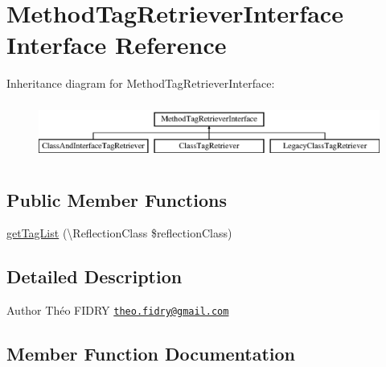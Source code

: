 \hypertarget{interface_prophecy_1_1_php_documentor_1_1_method_tag_retriever_interface}{}\section{Method\+Tag\+Retriever\+Interface Interface Reference}
\label{interface_prophecy_1_1_php_documentor_1_1_method_tag_retriever_interface}
Inheritance diagram for Method\+Tag\+Retriever\+Interface\+:\begin{figure}[H]
\begin{center}
\leavevmode
\includegraphics[height=1.895093cm]{interface_prophecy_1_1_php_documentor_1_1_method_tag_retriever_interface}
\end{center}
\end{figure}
\subsection*{Public Member Functions}
\begin{DoxyCompactItemize}
\item 
\mbox{\hyperlink{interface_prophecy_1_1_php_documentor_1_1_method_tag_retriever_interface_a2eb68ce00dcc84a156b9a2b7844a5e6f}{get\+Tag\+List}} (\textbackslash{}Reflection\+Class \$reflection\+Class)
\end{DoxyCompactItemize}


\subsection{Detailed Description}
\begin{DoxyAuthor}{Author}
Théo F\+I\+D\+RY \href{mailto:theo.fidry@gmail.com}{\tt theo.\+fidry@gmail.\+com} 
\end{DoxyAuthor}


\subsection{Member Function Documentation}
\mbox{\label{interface_prophecy_1_1_php_documentor_1_1_method_tag_retriever_interface_a2eb68ce00dcc84a156b9a2b7844a5e6f}} 
